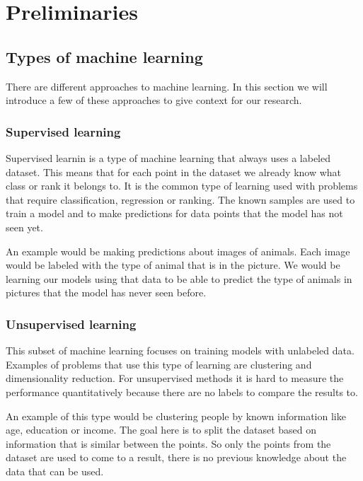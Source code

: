 \chapter{Preliminaries}\label{ch:preliminaries}

\section{Types of machine learning}
\label{sec:types-of-machine-learning}

There are different approaches to machine learning. In this section we will introduce a few of these approaches to give context for our research.


\subsection{Supervised learning}

Supervised learnin\cite{mohri_foundations_2012} is a type of machine learning that always uses a labeled dataset. This means that for each point in the dataset we already know what class or rank it belongs to. It is the common type of learning used with problems that require classification, regression or ranking. The known samples are used to train a model and to make predictions for data points that the model has not seen yet.

An example would be making predictions about images of animals. Each image would be labeled with the type of animal that is in the picture. We would be learning our models using that data to be able to predict the type of animals in pictures that the model has never seen before.

\subsection{Unsupervised learning}

This subset of machine learning focuses on training models with unlabeled data. Examples of problems that use this type of learning are clustering and dimensionality reduction. For unsupervised methods it is hard to measure the performance quantitatively because there are no labels to compare the results to.

An example of this type would be clustering people by known information like age, education or income. The goal here is to split the dataset based on information that is similar between the points. So only the points from the dataset are used to come to a result, there is no previous knowledge about the data that can be used.

